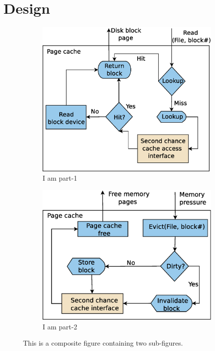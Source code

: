 \documentclass[a4paper, 11pt,twocolumn]{article}
\begin{document}
\section{Design}
\begin{figure}
\centering
\begin{subfigure}{0.41\linewidth}
\includegraphics[width=\columnwidth]{cc_get.eps}
 \caption{I am part-1}
 \label{fig:part1}
\end{subfigure} \hfill
%
\begin{subfigure}{0.41\linewidth}
\includegraphics[width=\columnwidth]{evict.eps}
 \caption{I am part-2}
 \label{fig:part2}
\end{subfigure} \hfill
%
\caption{This is a composite figure containing two sub-figures.}
\label{fig:composite}
\end{figure}
\end{document}
